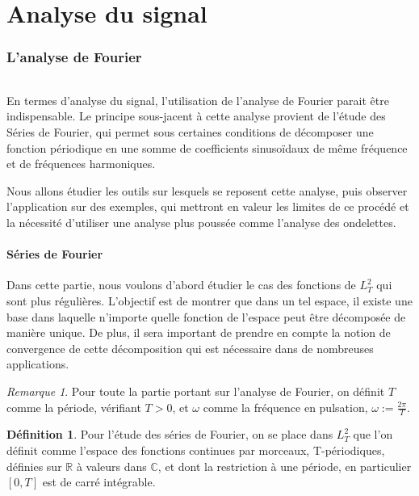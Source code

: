 \documentclass[]{article}
\theoremstyle{remark}
\newtheorem{myrem}{Remarque}
\theoremstyle{definition}
\newtheorem{mydef}{Définition}
\begin{document}
	\part{Analyse du signal}
	\section{L'analyse de Fourier}

	\paragraph*{}
En termes d'analyse du signal, l'utilisation de l'analyse de Fourier parait être indispensable. Le principe sous-jacent à cette analyse provient de l'étude des Séries de Fourier, qui permet sous certaines conditions de décomposer une fonction périodique en une somme de coefficients sinusoïdaux de même fréquence et de fréquences harmoniques. 


Nous allons étudier les outils sur lesquels se reposent cette analyse, puis observer l'application sur des exemples, qui mettront en valeur les limites de ce procédé et la nécessité d'utiliser une analyse plus poussée comme l'analyse des ondelettes.  

	
	\subsection {Séries de Fourier}
	Dans cette partie, nous voulons d'abord étudier le cas des fonctions de $L_T^2$ qui sont plus régulières. L'objectif est de montrer que dans un tel espace, il existe une base dans laquelle n'importe quelle fonction de l'espace peut être décomposée de manière unique. De plus, il sera important de prendre en compte la notion de convergence de cette décomposition qui est nécessaire dans de nombreuses applications. 
	
	
			\begin{myrem}
				Pour toute la partie portant sur l'analyse de Fourier, on définit $T$ comme la période, vérifiant $T>0$, et $\omega$ comme la fréquence en pulsation, $\omega := \frac{2\pi}{T}$.
			\end{myrem}
			
			\begin{mydef} 
				Pour l'étude des séries de Fourier, on se place dans $L^2_T$ que l'on définit comme l'espace des fonctions continues par morceaux, T-périodiques, définies sur $\mathbb{R}$ à valeurs dans $\mathbb{C}$, et dont la restriction à une période, en particulier $[0,T]$ est de carré intégrable.
			\end{mydef}
			
\end{document}
